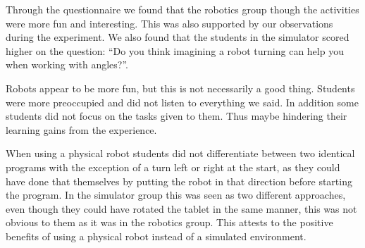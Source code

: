 Through the questionnaire we found that the robotics group though the activities were more fun and interesting. This was also supported by our observations during the experiment. We also found that the students in the simulator scored higher on the question: ``Do you think imagining a robot turning can help you
when working with angles?''. 

Robots appear to be more fun, but this is not necessarily a good thing. Students were more preoccupied and did not listen to everything we said. In addition some students did not focus on the tasks given to them. Thus maybe hindering their learning gains from the experience. 

When using a physical robot students did not differentiate between two identical programs with the exception of a turn left or right at the start, as they could have done that themselves by putting the robot in that direction before starting the program. In the simulator group this was seen as two different approaches, even though they could have rotated the tablet in the same manner, this was not obvious to them as it was in the robotics group. This attests to the positive benefits of using a physical robot instead of a simulated environment. 
